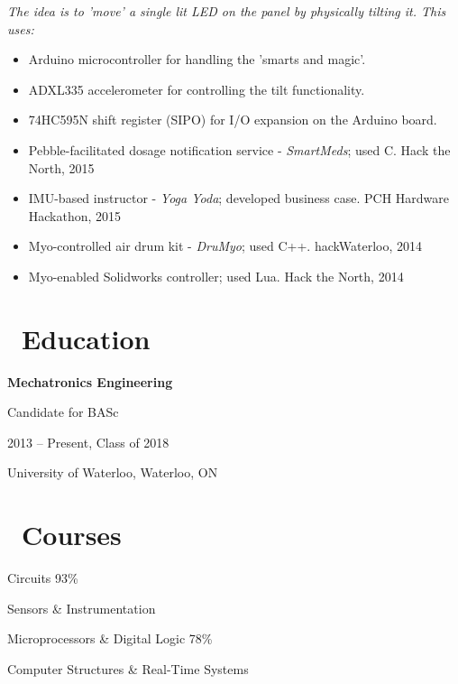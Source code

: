 \documentclass{resume}
\begin{document}
\textit{The idea is to 'move' a single lit LED on the panel by physically tilting it. This uses:}
\begin{itemize}
  \item Arduino microcontroller for handling the 'smarts and magic'.
  \item ADXL335 accelerometer for controlling the tilt functionality. 
  \item 74HC595N shift register (SIPO) for I/O expansion on the Arduino board.
\end{itemize}

\begin{itemize}
  \item Pebble-facilitated dosage notification service - \textit{SmartMeds}; used C. \hfill Hack the North, 2015
  \item IMU-based instructor - \textit{Yoga Yoda}; developed business case. \hfill PCH Hardware Hackathon, 2015
  \item Myo-controlled air drum kit - \textit{DruMyo}; used C++. \hfill hackWaterloo, 2014
  \item Myo-enabled Solidworks controller; used Lua. \hfill Hack the North, 2014
\end{itemize}

\begin{multicols}{2}

\section{\faGraduationCap\ Education}
\textbf{Mechatronics Engineering}\par
Candidate for BASc\par
2013 -- Present, Class of 2018\par
University of Waterloo, Waterloo, ON

\columnbreak

\section{\faBook\ Courses}
Circuits \hfill 93\% \par
Sensors \& Instrumentation\par
Microprocessors \& Digital Logic \hfill 78\% \par
Computer Structures \& Real-Time Systems

\end{multicols}
\end{document}
